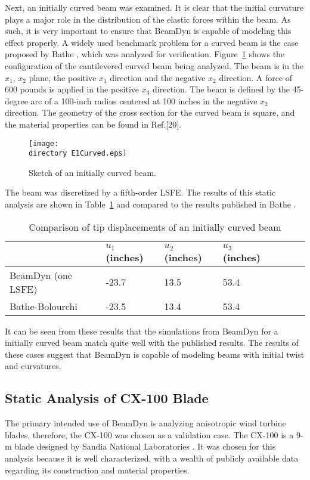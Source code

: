 \documentclass{aiaa-tc}
\def\directory{EPSF/}
\begin{document}
Next, an initially curved beam was examined. It is clear that the initial curvature plays a major role in the distribution of the elastic forces within the beam. As such, it is very important to ensure that BeamDyn is capable of modeling this effect properly. A widely used benchmark problem for a curved beam is the case proposed by Bathe \cite{Bathe1979}, which was analyzed for verification. Figure~\ref{E1Curved} shows the configuration of the cantilevered curved beam being analyzed. The beam is in the $x_1$, $x_2$ plane, the positive $x_1$ direction and the negative $x_2$ direction. A force of 600 pounds is applied in the positive $x_3$ direction. The beam is defined by the 45-degree arc of a 100-inch radius centered at 100 inches in the negative $x_2$ direction.  The geometry of the cross section for the curved beam is square, and the material properties can be found in Ref.[20]. 
\begin{figure}
\centering
\texttt{[image: \\directory E1Curved.eps]}
\caption{Sketch of an initially curved beam.} 
\label{E1Curved}
\end{figure}
The beam was discretized by a fifth-order LSFE. The results of this static analysis are shown in Table~\ref{E1CurvedDisp} and compared to the results published in Bathe \cite{Bathe1979}.

\begin{table}
\caption{\label{E1CurvedDisp} Comparison of tip displacements of an initially curved beam } 
\begin{center}
    \begin{tabular}{| l | l | l | l | l | l | l |}
    	\hline
    	        & $u_1$ (inches) & $u_2$ (inches) & $u_3$ (inches)  \\ \hline
    	BeamDyn (one LSFE) & -23.7     & 13.5       & 53.4      \\  \hline
    	Bathe-Bolourchi \cite{Bathe1979}   & -23.5     & 13.4       & 53.4     \\ \hline
    \end{tabular}
\end{center}
\end{table} 

It can be seen from these results that the simulations from BeamDyn for a initially curved beam match quite well with the published results. The results of these cases suggest that BeamDyn is capable of modeling beams with initial twist and curvatures.

\subsection{Static Analysis of CX-100 Blade}
The primary intended use of BeamDyn is analyzing anisotropic wind turbine blades, therefore, the CX-100 was chosen as a validation case. The CX-100 is a 9-m blade designed by Sandia National Laboratories \cite{paquette2006modeling}. It was chosen for this analysis because it is well characterized, with a wealth of publicly available data regarding its construction and material properties.
\end{document}
